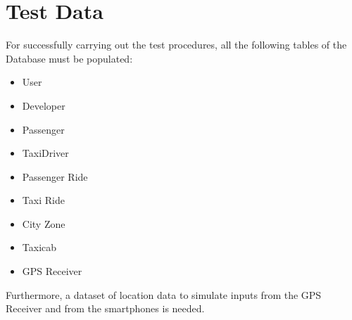 \section{Test Data}
For successfully carrying out the test procedures, all the following tables of the Database must be populated:
\begin{itemize}
	\item User
	\item Developer
	\item Passenger
	\item TaxiDriver
	\item Passenger Ride
	\item Taxi Ride
	\item City Zone
	\item Taxicab
	\item GPS Receiver
\end{itemize}
Furthermore, a dataset of location data to simulate inputs from the GPS Receiver  and from the smartphones is needed.
	